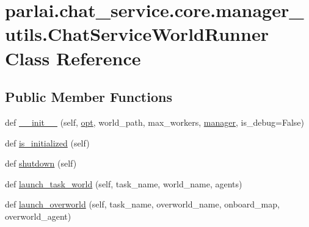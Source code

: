 \hypertarget{classparlai_1_1chat__service_1_1core_1_1manager__utils_1_1ChatServiceWorldRunner}{}\section{parlai.\+chat\+\_\+service.\+core.\+manager\+\_\+utils.\+Chat\+Service\+World\+Runner Class Reference}
\label{classparlai_1_1chat__service_1_1core_1_1manager__utils_1_1ChatServiceWorldRunner}
\subsection*{Public Member Functions}
\begin{DoxyCompactItemize}
\item 
def \hyperlink{classparlai_1_1chat__service_1_1core_1_1manager__utils_1_1ChatServiceWorldRunner_a01462412e195b5788e5cfd3a769f0c0d}{\+\_\+\+\_\+init\+\_\+\+\_\+} (self, \hyperlink{classparlai_1_1chat__service_1_1core_1_1manager__utils_1_1ChatServiceWorldRunner_aa4e0d4e5b87f4c136b0750cea2c339be}{opt}, world\+\_\+path, max\+\_\+workers, \hyperlink{classparlai_1_1chat__service_1_1core_1_1manager__utils_1_1ChatServiceWorldRunner_aebacdd9b5d3ab6a093945f22e0fe0a83}{manager}, is\+\_\+debug=False)
\item 
def \hyperlink{classparlai_1_1chat__service_1_1core_1_1manager__utils_1_1ChatServiceWorldRunner_a11f91dae76ebb8da127a09b4837d2da1}{is\+\_\+initialized} (self)
\item 
def \hyperlink{classparlai_1_1chat__service_1_1core_1_1manager__utils_1_1ChatServiceWorldRunner_a5bf689cb8ff9889da98990ad770fd9a3}{shutdown} (self)
\item 
def \hyperlink{classparlai_1_1chat__service_1_1core_1_1manager__utils_1_1ChatServiceWorldRunner_ac6b8bd46cafa3ce7a5a74f4c1c35b8a8}{launch\+\_\+task\+\_\+world} (self, task\+\_\+name, world\+\_\+name, agents)
\item 
def \hyperlink{classparlai_1_1chat__service_1_1core_1_1manager__utils_1_1ChatServiceWorldRunner_a3333ef43d6fb9f0ffcc79b8e639967b0}{launch\+\_\+overworld} (self, task\+\_\+name, overworld\+\_\+name, onboard\+\_\+map, overworld\+\_\+agent)
\end{DoxyCompactItemize}
